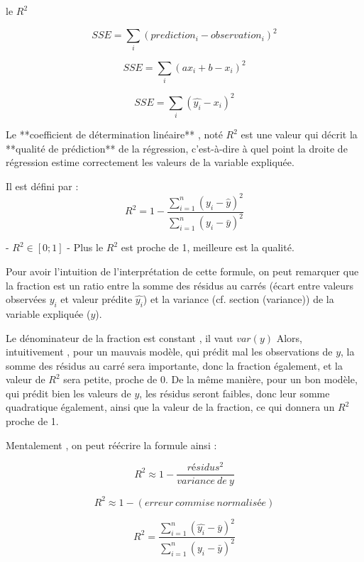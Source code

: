 \documentclass{beamer}
\begin{document}
\begin{frame}{le $R^2$}


$$SSE = \sum_i (prediction_i - observation_i)^2$$

$$SSE = \sum_i ( ax_i + b - x_i)^2$$

$$SSE = \sum_i ( \hat{y_i}- x_i)^2$$


Le **coefficient de détermination linéaire** ,  noté $R^2$  est une valeur qui décrit la **qualité de prédiction** de la régression,  c'est-à-dire à quel point la droite de régression estime correctement les valeurs de la variable expliquée.



Il est défini par : 
 $$R^2  = 1 - \frac{\sum_{i=1}^{n} (y_i - \hat{y})^2}{\sum_{i=1}^{n} (y_i - \bar{y})^2}$$


- $R^2 \in [0;1]$
- Plus le $R^2$ est proche de 1, meilleure est la qualité.

Pour avoir l'intuition de l'interprétation de cette formule, on peut remarquer que la fraction est un ratio entre la somme des résidus au carrés (écart entre valeurs observées $y_i$ et valeur prédite $\hat{y_i}$) et la variance (cf. section \@ref(variance)) de la variable expliquée ($y$).  

Le dénominateur de la fraction est constant , il vaut $var(y)$
Alors, intuitivement , pour un mauvais modèle, qui prédit mal les observations de $y$, la somme des résidus au carré sera importante, donc la fraction également, et la valeur de $R^2$  sera petite, proche de 0.
De la même manière, pour un bon modèle, qui prédit bien les valeurs de $y$, les résidus seront faibles, donc leur somme quadratique également, ainsi que la valeur de la fraction, ce qui donnera un $R^2$ proche de 1.

Mentalement , on peut réécrire la formule ainsi : 

$$R^2 \approx 1- \frac{résidus^2}{variance\ de\ y}$$


$$R^2 \approx 1- (erreur\ commise\ normalisée)$$


$$R^2  =  \frac{\sum_{i=1}^{n} (\hat{y_i} -\bar{y} )^2}{\sum_{i=1}^{n} (y_i - \bar{y})^2}$$


\end{frame}
\end{document}
